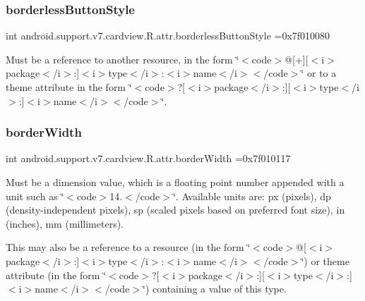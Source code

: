 \subsubsection{\texorpdfstring{borderless\+Button\+Style}{borderlessButtonStyle}}
{\footnotesize\ttfamily int android.\+support.\+v7.\+cardview.\+R.\+attr.\+borderless\+Button\+Style =0x7f010080\hspace{0.3cm}{\ttfamily [static]}}

Must be a reference to another resource, in the form \char`\"{}$<$code$>$@\mbox{[}+\mbox{]}\mbox{[}$<$i$>$package$<$/i$>$\+:\mbox{]}$<$i$>$type$<$/i$>$\+:$<$i$>$name$<$/i$>$$<$/code$>$\char`\"{} or to a theme attribute in the form \char`\"{}$<$code$>$?\mbox{[}$<$i$>$package$<$/i$>$\+:\mbox{]}\mbox{[}$<$i$>$type$<$/i$>$\+:\mbox{]}$<$i$>$name$<$/i$>$$<$/code$>$\char`\"{}. \mbox{\label{classandroid_1_1support_1_1v7_1_1cardview_1_1R_1_1attr_abd8bb035dd15229b04ee77ac0ab202d1}} 
\subsubsection{\texorpdfstring{border\+Width}{borderWidth}}
{\footnotesize\ttfamily int android.\+support.\+v7.\+cardview.\+R.\+attr.\+border\+Width =0x7f010117\hspace{0.3cm}{\ttfamily [static]}}

Must be a dimension value, which is a floating point number appended with a unit such as \char`\"{}$<$code$>$14.\+5sp$<$/code$>$\char`\"{}. Available units are\+: px (pixels), dp (density-\/independent pixels), sp (scaled pixels based on preferred font size), in (inches), mm (millimeters). 

This may also be a reference to a resource (in the form \char`\"{}$<$code$>$@\mbox{[}$<$i$>$package$<$/i$>$\+:\mbox{]}$<$i$>$type$<$/i$>$\+:$<$i$>$name$<$/i$>$$<$/code$>$\char`\"{}) or theme attribute (in the form \char`\"{}$<$code$>$?\mbox{[}$<$i$>$package$<$/i$>$\+:\mbox{]}\mbox{[}$<$i$>$type$<$/i$>$\+:\mbox{]}$<$i$>$name$<$/i$>$$<$/code$>$\char`\"{}) containing a value of this type. \mbox{\label{classandroid_1_1support_1_1v7_1_1cardview_1_1R_1_1attr_a017f8091d4f249f077388e3d68476f2d}} 
